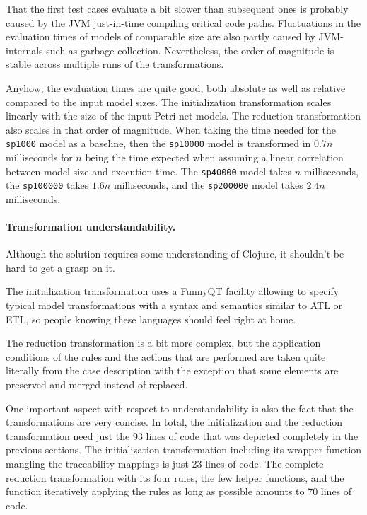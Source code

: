 \documentclass[11pt]{article}
\begin{document}
That the first test cases evaluate a bit slower than subsequent ones is
probably caused by the JVM just-in-time compiling critical code paths.
Fluctuations in the evaluation times of models of comparable size are also
partly caused by JVM-internals such as garbage collection.  Nevertheless, the
order of magnitude is stable across multiple runs of the transformations.

Anyhow, the evaluation times are quite good, both absolute as well as relative
compared to the input model sizes.  The initialization transformation scales
linearly with the size of the input Petri-net models.  The reduction
transformation also scales in that order of magnitude.  When taking the time
needed for the \verb|sp1000| model as a baseline, then the \verb|sp10000| model
is transformed in $0.7n$ milliseconds for $n$ being the time expected when
assuming a linear correlation between model size and execution time.  The
\verb|sp40000| model takes $n$ milliseconds, the \verb|sp100000| takes $1.6n$
milliseconds, and the \verb|sp200000| model takes $2.4n$ milliseconds.

\paragraph{Transformation understandability.}

Although the solution requires some understanding of Clojure, it shouldn't be
hard to get a grasp on it.

The initialization transformation uses a FunnyQT facility allowing to specify
typical model transformations with a syntax and semantics similar to ATL or
ETL, so people knowing these languages should feel right at home.

The reduction transformation is a bit more complex, but the application
conditions of the rules and the actions that are performed are taken quite
literally from the case description with the exception that some elements are
preserved and merged instead of replaced.

One important aspect with respect to understandability is also the fact that
the transformations are very concise.  In total, the initialization and the
reduction transformation need just the 93 lines of code that was depicted
completely in the previous sections.  The initialization transformation
including its wrapper function mangling the traceability mappings is just 23
lines of code.  The complete reduction transformation with its four rules, the
few helper functions, and the function iteratively applying the rules as long
as possible amounts to 70 lines of code.
\end{document}
